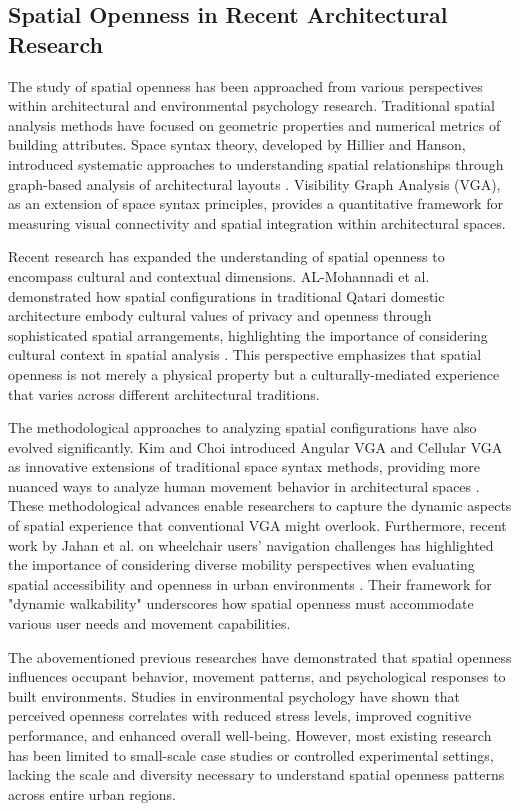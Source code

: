 \subsection{Spatial Openness in Recent Architectural Research}

The study of spatial openness has been approached from various perspectives within architectural and environmental 
psychology research. Traditional spatial analysis methods have focused on geometric properties and numerical metrics 
of building attributes. Space syntax theory, developed by Hillier and Hanson, introduced systematic approaches to 
understanding spatial relationships through graph-based analysis of architectural layouts \cite{hillier1987ideas}. 
Visibility Graph Analysis (VGA), as an extension of space syntax principles, provides a quantitative framework for 
measuring visual connectivity and spatial integration within architectural spaces.

Recent research has expanded the understanding of spatial openness to encompass cultural and contextual dimensions. 
AL-Mohannadi et al. demonstrated how spatial configurations in traditional Qatari domestic architecture embody 
cultural values of privacy and openness through sophisticated spatial arrangements, highlighting the importance of 
considering cultural context in spatial analysis \cite{almohannadi2020cultural}. This perspective emphasizes that 
spatial openness is not merely a physical property but a culturally-mediated experience that varies across different 
architectural traditions.

The methodological approaches to analyzing spatial configurations have also evolved significantly. Kim and Choi 
introduced Angular VGA and Cellular VGA as innovative extensions of traditional space syntax methods, providing 
more nuanced ways to analyze human movement behavior in architectural spaces \cite{kim2009angular}. These 
methodological advances enable researchers to capture the dynamic aspects of spatial experience that conventional 
VGA might overlook. Furthermore, recent work by Jahan et al. on wheelchair users' navigation challenges has 
highlighted the importance of considering diverse mobility perspectives when evaluating spatial accessibility 
and openness in urban environments \cite{jin2024spatial}. Their framework for "dynamic walkability" underscores 
how spatial openness must accommodate various user needs and movement capabilities.

The abovementioned previous researches have demonstrated that spatial openness influences occupant behavior, movement patterns, and 
psychological responses to built environments. Studies in environmental psychology have shown that perceived openness 
correlates with reduced stress levels, improved cognitive performance, and enhanced overall well-being. However, most 
existing research has been limited to small-scale case studies or controlled experimental settings, lacking the scale 
and diversity necessary to understand spatial openness patterns across entire urban regions.

